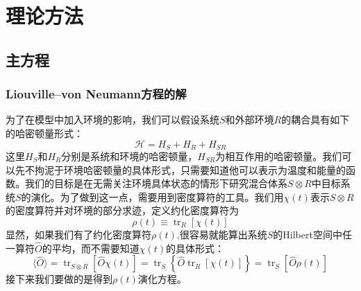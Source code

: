 
\chapter{理论方法}
\label{ch3}

\section{主方程}

\subsection{Liouville--von Neumann方程的解}
为了在模型中加入环境的影响，我们可以假设系统$S$和外部环境$R$的耦合具有如下的哈密顿量形式：
\begin{equation}
\mathcal{H}=H_{S}+H_{R}+H_{S R}
\label{Hsr}
\end{equation}
这里$H_{S}$和$H_{R}$分别是系统和环境的哈密顿量，$H_{SR}$为相互作用的哈密顿量。我们可以先不拘泥于环境哈密顿量的具体形式，只需要知道他可以表示为温度和能量的函数。我们的目标是在无需关注环境具体状态的情形下研究混合体系$S \otimes R$中目标系统$S$的演化。为了做到这一点，需要用到密度算符的工具。我们用$\chi(t)$表示$S \otimes R$的密度算符并对环境的部分求迹，定义约化密度算符为
\begin{equation}
\rho(t) \equiv \operatorname{tr}_{R}[\chi(t)]
\end{equation}
显然，如果我们有了约化密度算符$\rho(t)$,很容易就能算出系统$S$的Hilbert空间中任一算符$\hat{O}$的平均，而不需要知道$\chi(t)$的具体形式：
\begin{equation}
\langle\hat{O}\rangle=\operatorname{tr}_{S \otimes R}[\hat{O} \chi(t)]=\operatorname{tr}_{S}\left\{\hat{O} \operatorname{tr}_{R}[\chi(t)]\right\}=\operatorname{tr}_{S}[\hat{O} \rho(t)]
\end{equation}
接下来我们要做的是得到$\rho(t)$演化方程。

